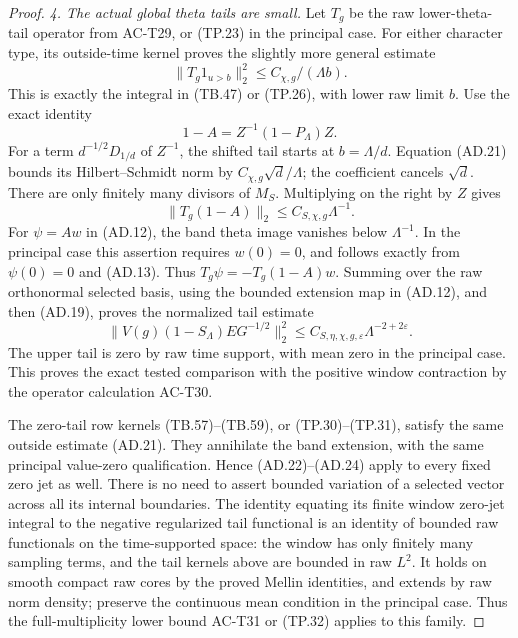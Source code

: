 \begin{proof}
\emph{4. The actual global theta tails are small.}
Let \(T_g\) be the raw lower-theta-tail operator
from AC-T29, or (TP.23) in the principal case.
For either character type, its outside-time
kernel proves the slightly more general estimate
\[
       \|T_g1_{u>b}\|_2^2\leq C_{\chi,g}/(\Lambda b).
 \tag{AD.21}
\]
This is exactly the integral in (TB.47) or
(TP.26), with lower raw limit \(b\).
Use the exact identity
\[
                  1-A=Z^{-1}(1-P_\Lambda)Z .
 \tag{AD.22}
\]
For a term \(d^{-1/2}D_{1/d}\) of \(Z^{-1}\),
the shifted tail starts at \(b=\Lambda/d\).
Equation (AD.21) bounds its Hilbert--Schmidt
norm by \(C_{\chi,g}\sqrt d/\Lambda\);
the coefficient cancels \(\sqrt d\).
There are only finitely many divisors of \(M_S\).
Multiplying on the right by \(Z\) gives
\[
                         \|T_g(1-A)\|_2
                                      \leq C_{S,\chi,g}\Lambda^{-1}.
 \tag{AD.23}
\]
For \(\psi=Aw\) in (AD.12), the band theta
image vanishes below \(\Lambda^{-1}\).
In the principal case this assertion requires
\(w(0)=0\), and follows exactly from
\(\psi(0)=0\) and (AD.13).
Thus \(T_g\psi=-T_g(1-A)w\).
Summing over the raw orthonormal selected
basis, using the bounded extension map in
(AD.12), and then (AD.19), proves the
normalized tail estimate
\[
 \|V(g)(1-S_\Lambda)E G^{-1/2}\|_2^2
                   \leq C_{S,\eta,\chi,g,\varepsilon}
                                  \Lambda^{-2+2\varepsilon}.
 \tag{AD.24}
\]
The upper tail is zero by raw time support,
with mean zero in the principal case.
This proves the exact tested comparison with
the positive window contraction by the
operator calculation AC-T30.

The zero-tail row kernels (TB.57)--(TB.59),
or (TP.30)--(TP.31), satisfy the same outside
estimate (AD.21).  They annihilate the band
extension, with the same principal value-zero
qualification.  Hence (AD.22)--(AD.24) apply
to every fixed zero jet as well.
There is no need to assert bounded variation
of a selected vector across all its internal
boundaries.  The identity equating its finite
window zero-jet integral to the negative
regularized tail functional is an identity
of bounded raw functionals on the time-supported
space: the window has only finitely many
sampling terms, and the tail kernels above
are bounded in raw \(L^2\).
It holds on smooth compact raw cores by the
proved Mellin identities, and extends by
raw norm density; preserve the continuous
mean condition in the principal case.
Thus the full-multiplicity lower bound
AC-T31 or (TP.32) applies to this family.


\end{proof}
